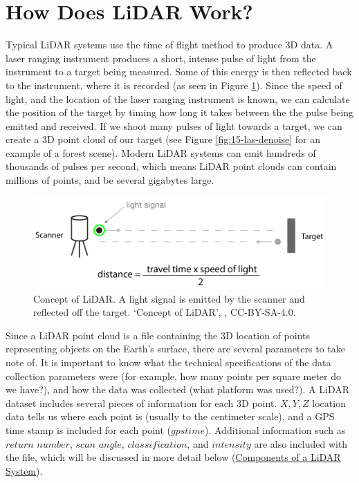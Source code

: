 \documentclass[
]{book}
\begin{document}
\section{How Does LiDAR Work?}\label{how-does-lidar-work}

Typical LiDAR systems use the time of flight method to produce 3D data. A laser ranging instrument produces a short, intense pulse of light from the instrument to a target being measured. Some of this energy is then reflected back to the instrument, where it is recorded (as seen in Figure \ref{fig:15-Concept-of-LiDAR}). Since the speed of light, and the location of the laser ranging instrument is known, we can calculate the position of the target by timing how long it takes between the the pulse being emitted and received. If we shoot many pulses of light towards a target, we can create a 3D point cloud of our target (see Figure \ref{fig:15-las-denoise} for an example of a forest scene). Modern LiDAR systems can emit hundreds of thousands of pulses per second, which means LiDAR point clouds can contain millions of points, and be several gigabytes large.



\begin{figure}
\includegraphics[width=0.75\linewidth]{images/15-Concept-of-LiDAR} \caption{Concept of LiDAR. A light signal is emitted by the scanner and reflected off the target. `Concept of LiDAR', \citep{cartographer3d_concept_2021}, CC-BY-SA-4.0.}\label{fig:15-Concept-of-LiDAR}
\end{figure}

Since a LiDAR point cloud is a file containing the 3D location of points representing objects on the Earth's surface, there are several parameters to take note of. It is important to know what the technical specifications of the data collection parameters were (for example, how many points per square meter do we have?), and how the data was collected (what platform was used?). A LiDAR dataset includes several pieces of information for each 3D point. \(X,Y,Z\) location data tells us where each point is (usually to the centimeter scale), and a GPS time stamp is included for each point (\(gpstime\)). Additional information such as \(return\) \(number\), \(scan\) \(angle\), \(classification\), and \(intensity\) are also included with the file, which will be discussed in more detail below (\hyperref[components-of-a-lidar-system]{Components of a LiDAR System}).
\end{document}
